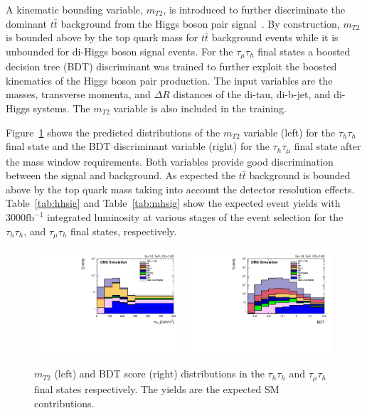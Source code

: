 A kinematic bounding variable, $m_{T2}$, is introduced to further
discriminate the dominant $t\bar{t}$ background from the Higgs boson pair signal~\cite{smt}. By construction, $m_{T2}$ is 
bounded above by the top quark mass for $t\bar{t}$ background events
while it is unbounded for di-Higgs boson signal events. For the
$\tau_{\mu}\tau_{h}$ final states a boosted decision tree (BDT) discriminant was trained to further exploit the boosted kinematics of the Higgs boson pair production. The input variables are the masses, transverse momenta, and $\Delta R$ distances of the di-tau, di-b-jet, and di-Higgs systems. The $m_{T2}$ variable is also included in the training.

Figure~\ref{fig:bdtout} shows the predicted distributions of the $m_{T2}$ variable (left) for the $\tau_{h}\tau_{h}$ final state and the BDT discriminant variable (right) for the $\tau_{h}\tau_{\mu}$ final state after the mass window requirements. Both variables provide good discrimination between the signal and background. As expected the $t\bar{t}$ background is bounded above by the top quark mass taking into account the detector resolution effects. Table~\ref{tab:hhsig} and Table~\ref{tab:mhsig} show the expected event yields with $3000 \mathrm{fb}^{-1}$ integrated luminosity at various stages of the event selection for the $\tau_{h}\tau_{h}$, and $\tau_{\mu}\tau_{h}$ final states, respectively. 

\begin{figure}[hbtp]
\begin{center}
\includegraphics[width=0.49\textwidth]{figures_chapter6/thth_mt2.pdf}   
\includegraphics[width=0.49\textwidth]{figures_chapter6/tmth_bdt.pdf}
\caption{$m_{T2}$ (left) and BDT score (right) distributions in  the $\tau_{h}\tau_{h}$ and  $\tau_{\mu}\tau_{h}$ final states respectively. The yields are the expected SM contributions.}
\label{fig:bdtout}
\end{center}
\end{figure}

